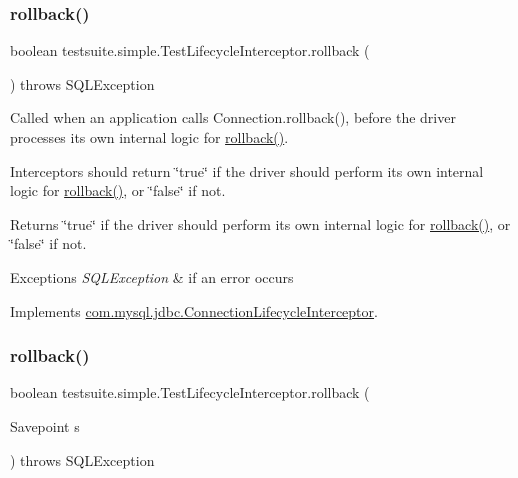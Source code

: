 \subsubsection{\texorpdfstring{rollback()}{rollback()}\hspace{0.1cm}{\footnotesize\ttfamily [1/2]}}
{\footnotesize\ttfamily boolean testsuite.\+simple.\+Test\+Lifecycle\+Interceptor.\+rollback (\begin{DoxyParamCaption}{ }\end{DoxyParamCaption}) throws S\+Q\+L\+Exception}

Called when an application calls Connection.\+rollback(), before the driver processes its own internal logic for \mbox{\hyperlink{classtestsuite_1_1simple_1_1_test_lifecycle_interceptor_a7cdeb42f7891e22dadce89627befbcdf}{rollback()}}.

Interceptors should return \char`\"{}true\char`\"{} if the driver should perform its own internal logic for \mbox{\hyperlink{classtestsuite_1_1simple_1_1_test_lifecycle_interceptor_a7cdeb42f7891e22dadce89627befbcdf}{rollback()}}, or \char`\"{}false\char`\"{} if not.

\begin{DoxyReturn}{Returns}
\char`\"{}true\char`\"{} if the driver should perform its own internal logic for \mbox{\hyperlink{classtestsuite_1_1simple_1_1_test_lifecycle_interceptor_a7cdeb42f7891e22dadce89627befbcdf}{rollback()}}, or \char`\"{}false\char`\"{} if not.
\end{DoxyReturn}

\begin{DoxyExceptions}{Exceptions}
{\em S\+Q\+L\+Exception} & if an error occurs \\
\hline
\end{DoxyExceptions}


Implements \mbox{\hyperlink{interfacecom_1_1mysql_1_1jdbc_1_1_connection_lifecycle_interceptor_a1e23e5b6724c8362009e5d87938507de}{com.\+mysql.\+jdbc.\+Connection\+Lifecycle\+Interceptor}}.

\mbox{\label{classtestsuite_1_1simple_1_1_test_lifecycle_interceptor_a75e431938104c0c3b8e1913b81ced992}} 
\subsubsection{\texorpdfstring{rollback()}{rollback()}\hspace{0.1cm}{\footnotesize\ttfamily [2/2]}}
{\footnotesize\ttfamily boolean testsuite.\+simple.\+Test\+Lifecycle\+Interceptor.\+rollback (\begin{DoxyParamCaption}\item[{Savepoint}]{s }\end{DoxyParamCaption}) throws S\+Q\+L\+Exception}

